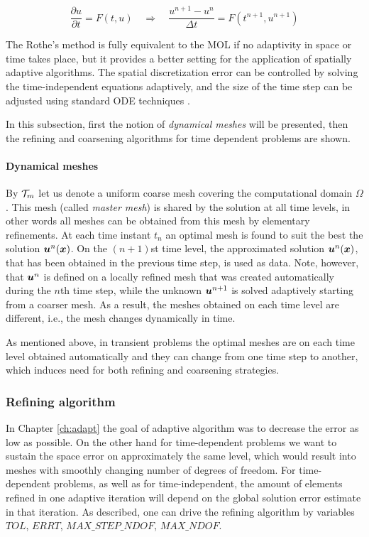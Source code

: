 \begin{equation}\label{rothe}
 \frac{\partial u}{\partial t} = F(t, u) \quad \Rightarrow \quad \frac{u^{n+1} - u^n}{\Delta t} = F(t^{n+1}, u^{n+1})
\end{equation}

The Rothe's method is fully equivalent to the MOL if no adaptivity in space or time takes place, but it provides a better setting for the application of spatially adaptive algorithms. The spatial discretization error can be controlled by solving the time-independent equations adaptively, and the size of 
the time step can be adjusted using standard ODE techniques \cite{deuflhard,hairer1,hairer2}.

In this subsection, first the notion of \emph{dynamical meshes} will be presented, then the refining and coarsening algorithms for time dependent problems are shown.

\paragraph{Dynamical meshes}

By ${\cal T}_m$ let us denote a uniform coarse mesh covering the computational domain 
$\Omega$. This mesh (called {\em master mesh}) is shared by the solution at all time levels, in other words all meshes can be obtained from this mesh by elementary refinements. At each time instant $t_n$ an optimal mesh is found to suit the best the solution $\mbox{\boldmath $u$}^n(\mbox{\boldmath $x$})$. On the $(n+1)$st time level, the approximated solution $\mbox{\boldmath $u$}^n(\mbox{\boldmath $x$})$, that has been obtained in the previous time step, is used as data. Note, however, that $\mbox{\boldmath $u$}^n$ is defined on a locally refined mesh that was created automatically during the $n$th time step, while the unknown $\mbox{\boldmath $u$}^{n+1}$ is solved adaptively starting from a coarser mesh. As a result, the meshes obtained on each time level are different, i.e., the mesh changes dynamically in time. 

As mentioned above, in transient problems the optimal meshes are on each time level obtained automatically and they can change from one time step to another, which induces need for both refining and coarsening strategies.

\subsubsection{Refining algorithm}

In Chapter \ref{ch:adapt} the goal of adaptive algorithm was to decrease the error as low as possible. On the other hand for time-dependent problems we want to sustain the space error on approximately the same level, which would result into meshes with smoothly changing number of degrees of freedom. For time-dependent problems, as well as for time-independent, the amount of elements refined in one adaptive iteration will depend on the global solution error estimate in that iteration. As described, one can drive the refining algorithm by variables $TOL$, $ERRT$, $MAX\_STEP\_NDOF$, $MAX\_NDOF$.


